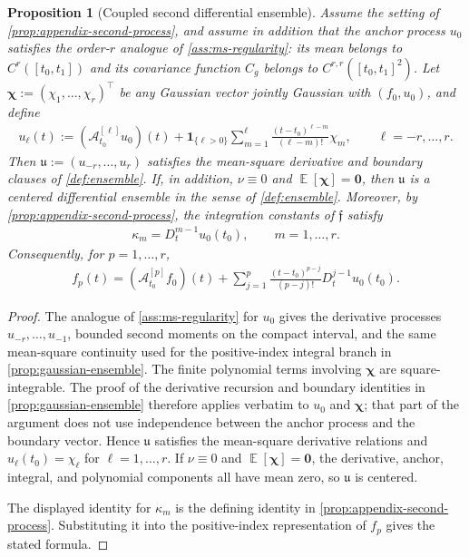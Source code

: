 \documentclass[11pt,a4paper]{article}
\newtheorem{proposition}{Proposition}
\theoremstyle{definition}
\theoremstyle{remark}
\DeclareMathOperator{\E}{\mathbb{E}}
\begin{document}
\begin{proposition}[Coupled second differential ensemble]\label{prop:appendix-coupled-second-ensemble}
Assume the setting of \cref{prop:appendix-second-process}, and assume in addition that the anchor process \(u_0\) satisfies the order-\(r\) analogue of \cref{ass:ms-regularity}: its mean belongs to \(C^r([t_0,t_1])\) and its covariance function \(C_g\) belongs to \(C^{r,r}([t_0,t_1]^2)\). Let \(\boldsymbol{\chi}:=(\chi_1,\ldots,\chi_r)^\top\) be any Gaussian vector jointly Gaussian with \((f_0,u_0)\), and define
\begin{align*}
u_\ell(t):=(\mathcal A_{t_0}^{[\ell]}u_0)(t)+\mathbf{1}_{\{\ell>0\}}\sum_{m=1}^{\ell}\frac{(t-t_0)^{\ell-m}}{(\ell-m)!}\chi_m,
\qquad \ell=-r,\ldots,r.
\end{align*}
Then \(\mathfrak{u}:=(u_{-r},\ldots,u_r)\) satisfies the mean-square derivative and boundary clauses of \cref{def:ensemble}. If, in addition, \(\nu\equiv 0\) and \(\E[\boldsymbol{\chi}]=\mathbf 0\), then \(\mathfrak{u}\) is a centered differential ensemble in the sense of \cref{def:ensemble}. Moreover, by \cref{prop:appendix-second-process}, the integration constants of \(\mathfrak{f}\) satisfy
\begin{align*}
\kappa_m=D_t^{m-1}u_0(t_0),
\qquad m=1,\ldots,r.
\end{align*}
Consequently, for \(p=1,\ldots,r\),
\begin{align*}
f_p(t)=(\mathcal A_{t_0}^{[p]}f_0)(t)+\sum_{j=1}^{p}\frac{(t-t_0)^{p-j}}{(p-j)!}D_t^{j-1}u_0(t_0).
\end{align*}
\end{proposition}

\begin{proof}
The analogue of \cref{ass:ms-regularity} for \(u_0\) gives the derivative processes \(u_{-r},\ldots,u_{-1}\), bounded second moments on the compact interval, and the same mean-square continuity used for the positive-index integral branch in \cref{prop:gaussian-ensemble}. The finite polynomial terms involving \(\boldsymbol{\chi}\) are square-integrable. The proof of the derivative recursion and boundary identities in \cref{prop:gaussian-ensemble} therefore applies verbatim to \(u_0\) and \(\boldsymbol{\chi}\); that part of the argument does not use independence between the anchor process and the boundary vector. Hence \(\mathfrak u\) satisfies the mean-square derivative relations and \(u_\ell(t_0)=\chi_\ell\) for \(\ell=1,\ldots,r\). If \(\nu\equiv0\) and \(\E[\boldsymbol{\chi}]=\mathbf0\), the derivative, anchor, integral, and polynomial components all have mean zero, so \(\mathfrak u\) is centered.

The displayed identity for \(\kappa_m\) is the defining identity in \cref{prop:appendix-second-process}. Substituting it into the positive-index representation of \(f_p\) gives the stated formula.
\end{proof}
\end{document}
